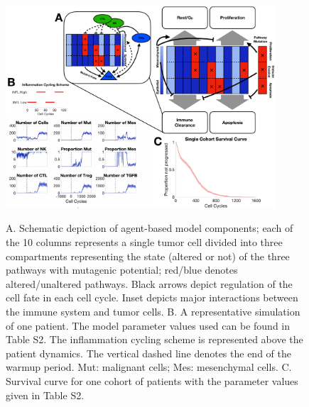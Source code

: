 \documentclass[11pt]{article}
\begin{document}
\begin{figure}
\center
{\includegraphics[width=0.9\textwidth]{Figure1/Figure1.pdf}}
\caption{A. Schematic depiction of agent-based model components; each of the 10 columns represents a single tumor cell divided into three compartments representing the state (altered or not) of the three pathways with mutagenic potential; red/blue denotes altered/unaltered pathways. Black arrows depict regulation of the cell fate in each cell cycle. Inset depicts major interactions between the immune system and tumor cells.
B. A representative simulation of one patient. The model parameter values used can be found in Table S2. 
The inflammation cycling scheme is represented above the patient dynamics. The vertical dashed line denotes the end of the warmup period. Mut: malignant cells; Mes: mesenchymal cells. 
C. Survival curve for one cohort of patients with the parameter values given in Table S2.}
\label{fig:ModelIntro}
\end{figure}
\end{document}
